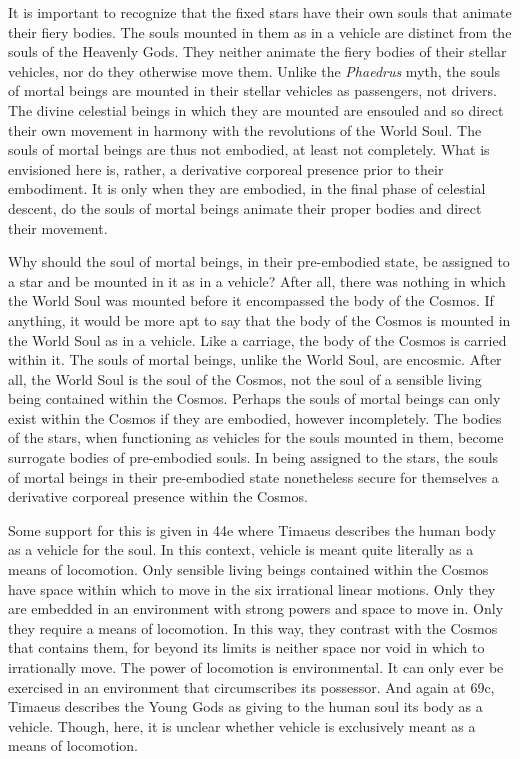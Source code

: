 It is important to recognize that the fixed stars have their own souls that animate their fiery bodies. The souls mounted in them as in a vehicle are distinct from the souls of the Heavenly Gods. They neither animate the fiery bodies of their stellar vehicles, nor do they otherwise move them. Unlike the \emph{Phaedrus} myth, the souls of mortal beings are mounted in their stellar vehicles as passengers, not drivers. The divine celestial beings in which they are mounted are ensouled and so direct their own movement in harmony with the revolutions of the World Soul. The souls of mortal beings are thus not embodied, at least not completely. What is envisioned here is, rather, a derivative corporeal presence prior to their embodiment. It is only when they are embodied, in the final phase of celestial descent, do the souls of mortal beings animate their proper bodies and direct their movement.

Why should the soul of mortal beings, in their pre-embodied state, be assigned to a star and be mounted in it as in a vehicle? After all, there was nothing in which the World Soul was mounted before it encompassed the body of the Cosmos. If anything, it would be more apt to say that the body of the Cosmos is mounted in the World Soul as in a vehicle. Like a carriage, the body of the Cosmos is carried within it. The souls of mortal beings, unlike the World Soul, are encosmic. After all, the World Soul is the soul of the Cosmos, not the soul of a sensible living being contained within the Cosmos. Perhaps the souls of mortal beings can only exist within the Cosmos if they are embodied, however incompletely. The bodies of the stars, when functioning as vehicles for the souls mounted in them, become surrogate bodies of pre-embodied souls. In being assigned to the stars, the souls of mortal beings in their pre-embodied state nonetheless secure for themselves a derivative corporeal presence within the Cosmos. 

Some support for this is given in 44e where Timaeus describes the human body as a vehicle for the soul. In this context, vehicle is meant quite literally as a means of locomotion. Only sensible living beings contained within the Cosmos have space within which to move in the six irrational linear motions. Only they are embedded in an environment with strong powers and space to move in. Only they require a means of locomotion. In this way, they contrast with the Cosmos that contains them, for beyond its limits is neither space nor void in which to irrationally move. The power of locomotion is environmental. It can only ever be exercised in an environment that circumscribes its possessor. And again at 69c, Timaeus describes the Young Gods as giving to the human soul its body as a vehicle. Though, here, it is unclear whether vehicle is exclusively meant as a means of locomotion.

